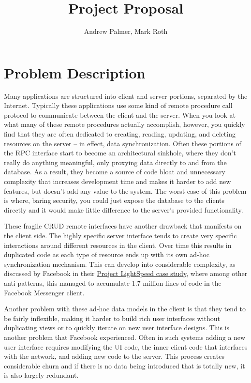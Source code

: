 \documentclass[12pt]{article}
\title{Project Proposal}
\author{Andrew Palmer, Mark Roth}
\begin{document}
    \maketitle

    \section{Problem Description}
    Many applications are structured into client and server portions, separated by the Internet.
    Typically these applications use some kind of remote procedure call protocol to communicate between the client and the server.
    When you look at what many of these remote procedures actually accomplish, however, you quickly find that they are often dedicated to creating, reading, updating, and deleting resources on the server -- in effect, data synchronization.
    Often these portions of the RPC interface start to become an architectural sinkhole, where they don't really do anything meaningful, only proxying data directly to and from the database.
    As a result, they become a source of code bloat and unnecessary complexity that increases development time and makes it harder to add new features, but doesn't add any value to the system.
    The worst case of this problem is where, baring security, you could just expose the database to the clients directly and it would make little difference to the server's provided functionality.

    These fragile CRUD remote interfaces have another drawback that manifests on the client side.
    The highly specific server interface tends to create very specific interactions around different resources in the client.
    Over time this results in duplicated code as each type of resource ends up with its own ad-hoc synchronization mechanism.
    This can develop into considerable complexity, as discussed by Facebook in their \href{https://engineering.fb.com/2020/03/02/data-infrastructure/messenger/}{Project LightSpeed case study}, where among other anti-patterns, this managed to accumulate 1.7 million lines of code in the Facebook Messenger client.

    Another problem with these ad-hoc data models in the client is that they tend to be fairly inflexible, making it harder to build rich user interfaces without duplicating views or to quickly iterate on new user interface designs.
    This is another problem that Facebook experienced.
    Often in such systems adding a new user interface requires modifying the UI code, the inner client code that interfaces with the network, and adding new code to the server.
    This process creates considerable churn and if there is no data being introduced that is totally new, it is also largely redundant.
\end{document}
